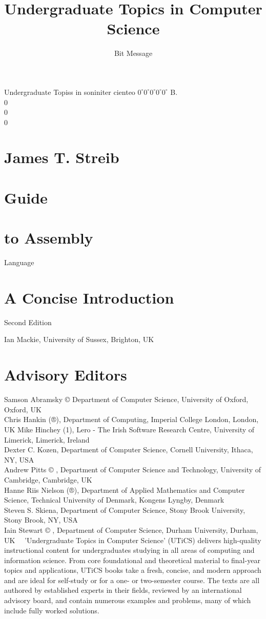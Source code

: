 \documentclass[10pt]{article}
\title{Undergraduate Topics in Computer Science }
\author{Bit Message}
\date{}
\begin{document}
\maketitle
Undergraduate Topiss in soniniter cienteo $0^{\circ} 0^{\circ} 0^{\circ} 0^{\circ} 0^{\circ}$ B.\\
0\\
0\\
0

\section*{James T. Streib}
\section*{Guide}
\section*{to Assembly}
 Language\section*{A Concise Introduction}
Second Edition

Ian Mackie, University of Sussex, Brighton, UK

\section*{Advisory Editors}
Samson Abramsky © Department of Computer Science, University of Oxford, Oxford, UK\\
Chris Hankin (®), Department of Computing, Imperial College London, London, UK Mike Hinchey (1), Lero - The Irish Software Research Centre, University of Limerick, Limerick, Ireland\\
Dexter C. Kozen, Department of Computer Science, Cornell University, Ithaca, NY, USA\\
Andrew Pitts © , Department of Computer Science and Technology, University of Cambridge, Cambridge, UK\\
Hanne Riis Nielson (®), Department of Applied Mathematics and Computer Science, Technical University of Denmark, Kongens Lyngby, Denmark\\
Steven S. Skiena, Department of Computer Science, Stony Brook University, Stony Brook, NY, USA\\
Iain Stewart © , Department of Computer Science, Durham University, Durham, UK\
\
'Undergraduate Topics in Computer Science' (UTiCS) delivers high-quality instructional content for undergraduates studying in all areas of computing and information science. From core foundational and theoretical material to final-year topics and applications, UTiCS books take a fresh, concise, and modern approach and are ideal for self-study or for a one- or two-semester course. The texts are all authored by established experts in their fields, reviewed by an international advisory board, and contain numerous examples and problems, many of which include fully worked solutions.
\end{document}
